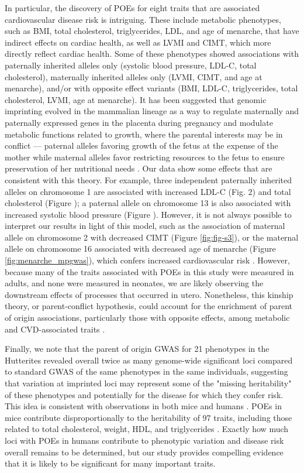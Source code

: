  In particular, the discovery of POEs for eight traits that are associated cardiovascular disease risk is intriguing. These include metabolic phenotypes, such as BMI, total cholesterol, triglycerides, LDL, and age of menarche, that have indirect effects on cardiac health, as well as LVMI and CIMT, which more directly reflect cardiac health. Some of these phenotypes showed associations with paternally inherited alleles only (systolic blood pressure, LDL-C, total cholesterol), maternally inherited alleles only (LVMI, CIMT, and age at menarche), and/or with opposite effect variants (BMI, LDL-C, triglycerides, total cholesterol, LVMI, age at menarche). It has been suggested that genomic imprinting evolved in the mammalian lineage as a way to regulate maternally and paternally expressed genes in the placenta during pregnancy and modulate metabolic functions related to growth, where the parental interests may be in conflict — paternal alleles favoring growth of the fetus at the expense of the mother while maternal alleles favor restricting resources to the fetus to ensure preservation of her nutritional needs \cite{Haig:2000if,Barlow:2014dv,Patten:2016cb}. Our data show some effects that are consistent with this theory. For example, three independent paternally inherited alleles on chromosome 1 are associated with increased LDL-C (Fig. 2) and total cholesterol (Figure \label{fig:fig-s7}); a paternal allele on chromosome 13 is also associated with increased systolic blood pressure (Figure \label{fig:fig-s6}). However, it is not always possible to interpret our results in light of this model, such as the association of maternal allele on chromosome 2 with decreased CIMT (Figure \ref{fig:fig-s3}), or the maternal allele on chromosome 16 associated with decreased age of menarche (Figure  \ref{fig:menarche_mpgwas}), which confers increased cardiovascular risk \cite{Canoy:2015ha}. However, because many of the traits associated with POEs in this study were measured in adults, and none were measured in neonates, we are likely observing the downstream effects of processes that occurred in utero. Nonetheless, this kinship theory, or parent-conflict hypothesis, could account for the enrichment of parent of origin associations, particularly those with opposite effects, among metabolic and CVD-associated traits \cite{Peters2014}.
 
 Finally, we note that the parent of origin GWAS for 21 phenotypes in the Hutterites revealed overall twice as many genome-wide significant loci compared to standard GWAS of the same phenotypes in the same individuals, suggesting that variation at imprinted loci may represent some of the "missing heritability" of these phenotypes and potentially for the disease for which they confer risk. This idea is consistent with observations in both mice and humans \cite{Laurin:2017jv}. POEs in mice contribute disproportionally to the heritability of 97 traits, including those related to total cholesterol, weight, HDL, and triglycerides \cite{Mott2014}. Exactly how much loci with POEs in humans contribute to phenotypic variation and disease risk overall remains to be determined, but our study provides compelling evidence that it is likely to be significant for many important traits.


